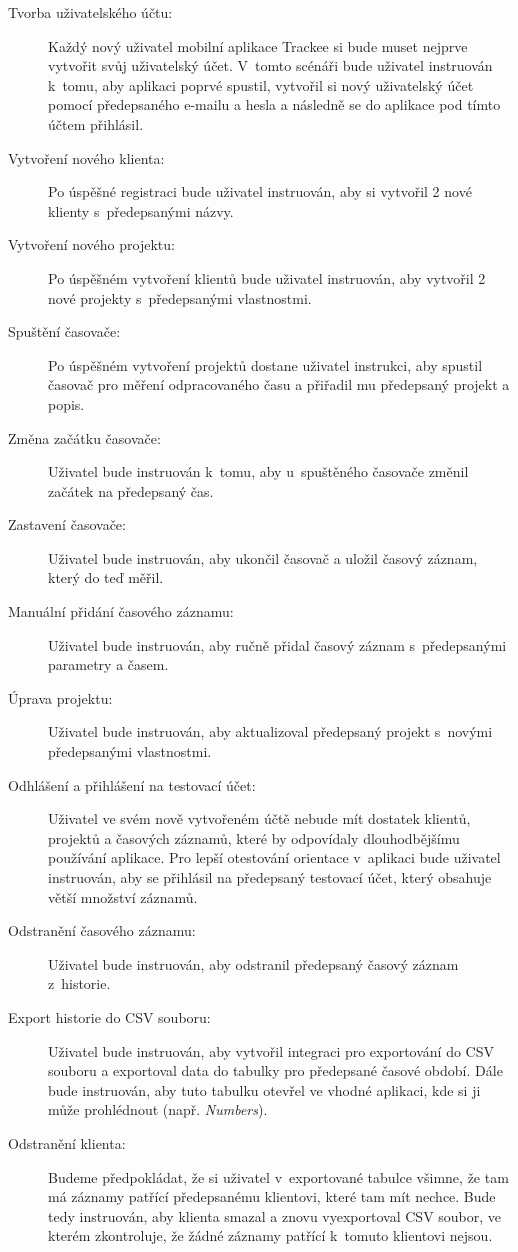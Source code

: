 \begin{description}
\item[Tvorba uživatelského účtu:] Každý nový uživatel mobilní aplikace Trackee si bude muset nejprve vytvořit svůj uživatelský účet. V~tomto scénáři bude uživatel instruován k~tomu, aby aplikaci poprvé spustil, vytvořil si nový uživatelský účet pomocí předepsaného e-mailu a hesla a následně se do aplikace pod tímto účtem přihlásil. 
\item[Vytvoření nového klienta:] Po úspěšné registraci bude uživatel instruován, aby si vytvořil 2 nové klienty s~předepsanými názvy.
\item[Vytvoření nového projektu:] Po úspěšném vytvoření klientů bude uživatel instruován, aby vytvořil 2 nové projekty s~předepsanými vlastnostmi.
\item[Spuštění časovače:] Po úspěšném vytvoření projektů dostane uživatel instrukci, aby spustil časovač pro měření odpracovaného času a přiřadil mu předepsaný projekt a popis.
\item[Změna začátku časovače:] Uživatel bude instruován k~tomu, aby u~spuštěného časovače změnil začátek na předepsaný čas.
\item[Zastavení časovače:] Uživatel bude instruován, aby ukončil časovač a uložil časový záznam, který do teď měřil.
\item[Manuální přidání časového záznamu:] Uživatel bude instruován, aby ručně přidal časový záznam s~předepsanými parametry a časem.
\item[Úprava projektu:] Uživatel bude instruován, aby aktualizoval předepsaný projekt s~novými předepsanými vlastnostmi.
\item[Odhlášení a přihlášení na testovací účet:] Uživatel ve svém nově vytvořeném účtě nebude mít dostatek klientů, projektů a časových záznamů, které by odpovídaly dlouhodbějšímu používání aplikace. Pro lepší otestování orientace v~aplikaci bude uživatel instruován, aby se přihlásil na předepsaný testovací účet, který obsahuje větší množství záznamů.
\item[Odstranění časového záznamu:] Uživatel bude instruován, aby odstranil předepsaný časový záznam z~historie.
\item[Export historie do CSV souboru:] Uživatel bude instruován, aby vytvořil integraci pro exportování do CSV souboru a exportoval data do tabulky pro předepsané časové období. Dále bude instruován, aby tuto tabulku otevřel ve vhodné aplikaci, kde si ji může prohlédnout (např. \emph{Numbers}).
\item[Odstranění klienta:] Budeme předpokládat, že si uživatel v~exportované tabulce všimne, že tam má záznamy patřící předepsanému klientovi, které tam mít nechce. Bude tedy instruován, aby klienta smazal a znovu vyexportoval CSV soubor, ve kterém zkontroluje, že žádné záznamy patřící k~tomuto klientovi nejsou.

\end{description}
